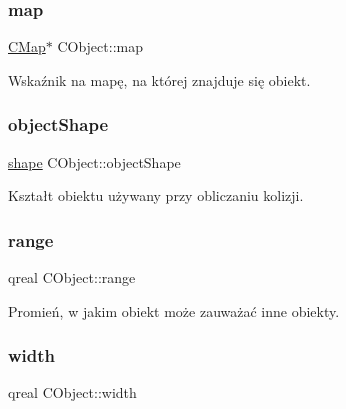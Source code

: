 \subsubsection{\texorpdfstring{map}{map}}
{\footnotesize\ttfamily \mbox{\hyperlink{class_c_map}{C\+Map}}$\ast$ C\+Object\+::map\hspace{0.3cm}{\ttfamily [protected]}}



Wskaźnik na mapę, na której znajduje się obiekt. 

\mbox{\label{class_c_object_a97a0d16c78ba0afc53f6df41055e6d94}} 
\subsubsection{\texorpdfstring{object\+Shape}{objectShape}}
{\footnotesize\ttfamily \mbox{\hyperlink{cobject_8h_a45cde9abb508c62d67c3bb2b9bf566a5}{shape}} C\+Object\+::object\+Shape\hspace{0.3cm}{\ttfamily [protected]}}



Kształt obiektu używany przy obliczaniu kolizji. 

\mbox{\label{class_c_object_a0d3f8546df4d7620602646e7661d905e}} 
\subsubsection{\texorpdfstring{range}{range}}
{\footnotesize\ttfamily qreal C\+Object\+::range\hspace{0.3cm}{\ttfamily [protected]}}



Promień, w jakim obiekt może zauważać inne obiekty. 

\mbox{\label{class_c_object_a6fceaa9b662c540109880306373fef4a}} 
\subsubsection{\texorpdfstring{width}{width}}
{\footnotesize\ttfamily qreal C\+Object\+::width\hspace{0.3cm}{\ttfamily [protected]}}



